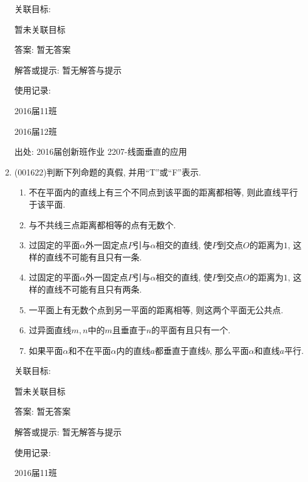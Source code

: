 \documentclass[10pt,a4paper]{article}
\newcommand{\blank}[1]{\underline{\hbox to #1pt{}}}
\begin{document}
\begin{enumerate}[1.]
关联目标:

暂未关联目标

答案: 暂无答案

解答或提示: 暂无解答与提示

使用记录:

2016届11班				

2016届12班				


出处: 2016届创新班作业	2207-线面垂直的应用
\item { (001622)}判断下列命题的真假, 并用``{\rm T}''或``{\rm F}''表示.\\ 
\begin{enumerate}[\blank{30}(1)]
\item 不在平面内的直线上有三个不同点到该平面的距离都相等, 则此直线平行于该平面.\\ 
\item 与不共线三点距离都相等的点有无数个.\\ 
\item 过固定的平面$\alpha$外一固定点$P$引与$\alpha$相交的直线, 使$P$到交点$O$的距离为$1$, 这样的直线不可能有且只有一条.\\ 
\item 过固定的平面$\alpha$外一固定点$P$引与$\alpha$相交的直线, 使$P$到交点$O$的距离为$1$, 这样的直线不可能有且只有两条.\\ 
\item 一平面上有无数个点到另一平面的距离相等, 则这两个平面无公共点.\\ 
\item 过异面直线$m,n$中的$m$且垂直于$n$的平面有且只有一个.\\ 
\item 如果平面$\alpha$和不在平面$\alpha$内的直线$a$都垂直于直线$b$, 那么平面$\alpha$和直线$a$平行.\\ 
\end{enumerate}


关联目标:

暂未关联目标

答案: 暂无答案

解答或提示: 暂无解答与提示

使用记录:

2016届11班							


\end{enumerate}
\end{document}
